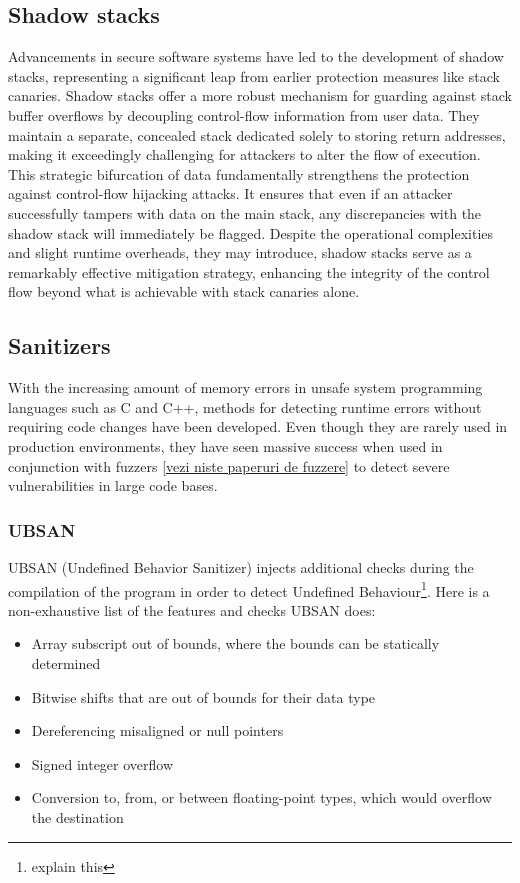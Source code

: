 \documentclass{article}
\begin{document}
\subsection{Shadow stacks}
Advancements in secure software systems have led to the development of shadow stacks, representing a significant leap from earlier protection measures like stack canaries. Shadow stacks offer a more robust mechanism for guarding against stack buffer overflows by decoupling control-flow information from user data. They maintain a separate, concealed stack dedicated solely to storing return addresses, making it exceedingly challenging for attackers to alter the flow of execution. This strategic bifurcation of data fundamentally strengthens the protection against control-flow hijacking attacks. It ensures that even if an attacker successfully tampers with data on the main stack, any discrepancies with the shadow stack will immediately be flagged. Despite the operational complexities and slight runtime overheads, they may introduce, shadow stacks serve as a remarkably effective mitigation strategy, enhancing the integrity of the control flow beyond what is achievable with stack canaries alone.

\subsection{Sanitizers}
With the increasing amount of memory errors in unsafe system programming languages such as C and C++, methods for detecting runtime errors without requiring code changes have been developed. Even though they are rarely used in production environments, they have seen massive success when used in conjunction with fuzzers \ref{vezi niste paperuri de fuzzere} to detect severe vulnerabilities in large code bases.

\subsubsection{UBSAN}
UBSAN (Undefined Behavior Sanitizer) injects additional checks during the compilation of the program in order to detect Undefined Behaviour\footnote{explain this}. Here is a non-exhaustive list of the features and checks UBSAN does:

\begin{itemize}
  \item Array subscript out of bounds, where the bounds can be statically determined
  \item Bitwise shifts that are out of bounds for their data type
  \item Dereferencing misaligned or null pointers
  \item Signed integer overflow
  \item Conversion to, from, or between floating-point types, which would overflow the destination
\end{itemize}
\end{document}

